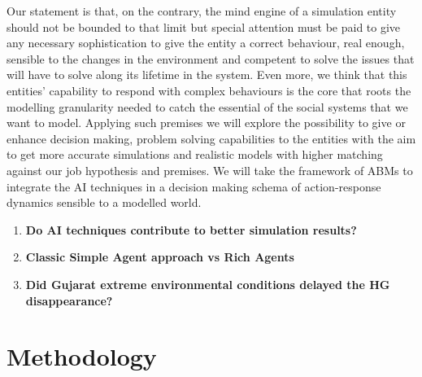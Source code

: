 \documentclass[11pt,oneside,a4paper,openright]{report}
\begin{document}
Our statement is that, on the contrary, the mind engine of a simulation entity should not be bounded to that limit but special attention must be paid to give any necessary sophistication to give the entity a correct behaviour, real enough, sensible to the changes in the environment and competent to solve the issues that will have to solve along its lifetime in the system. Even more, we think that this entities' capability to respond with complex behaviours is the core that roots the modelling granularity needed to catch the essential of the social systems that we want to model.
Applying such premises we will explore the possibility to give or enhance decision making, problem solving
capabilities to the entities with the aim to get more accurate simulations and realistic models with higher matching against our job hypothesis and premises. We will take the framework of ABMs to integrate the AI techniques in a decision making schema of action-response dynamics sensible to a modelled world.


\begin{enumerate}
 \item \indent \textbf{Do AI techniques contribute to better simulation results?}
 \item \indent \textbf{Classic Simple Agent approach vs Rich Agents}
 \item \indent \textbf{Did Gujarat extreme environmental conditions delayed the HG disappearance?}
\end{enumerate}

\newpage 




\chapter{Methodology}

\end{document}
